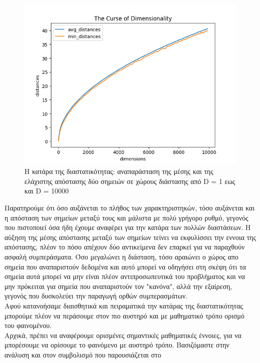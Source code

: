 \documentclass[12pt]{article}
\newenvironment{matlab}
	{\begin{figure}[H]\centering\captionsetup{justification=centering}}
	{\end{figure}}
\begin{document}
\begin{matlab}
	\includegraphics[scale=0.6]{images/the_curse_of_dimensionality_1_to_10000.png}
	\caption{Η κατάρα της διαστατικότητας:  αναπαράσταση της μέσης και της ελάχιστης απόστασης δύο σημειών σε χώρους διάστασης από D = 1 εως και D = 10000}
\end{matlab}

Παρατηρούμε ότι όσο αυξάνεται το πλήθος των χαρακτηριστηκών, τόσο αυξάνεται και η απόσταση των σημείων μεταξύ τους και μάλιστα με πολύ γρήγορο ρυθμό, γεγονός που πιστοποιεί όσα ήδη έχουμε αναφέρει για την κατάρα των πολλών διαστάσεων. Η αύξηση της μέσης απόστασης μεταξύ των σημείων τείνει να εκφυλίσσει την εννοια της απόστασης, πλέον το πόσο απέχουν δύο αντικείμενα δεν επαρκεί για να παραχθούν ασφαλή συμπεράσματα. Όσο μεγαλώνει η διάσταση, τόσο αραιώνει ο χώρος απο σημεία που αναπαριστούν δεδομένα και αυτό μπορεί να οδηγήσει στη σκέψη ότι τα σημεία αυτά μπορεί να μην είναι πλέον αντιπροσωπευτικά του προβλήματος και να μην πρόκειται για σημεία που αναπαριστούν τον "κανόνα", αλλά την εξαίρεση, γεγονός που δυσκολεύει την παραγωγή ορθών συμπερασμάτων. \\

Αφού κατανοήσαμε διαισθητικά και πειραματικά την κατάρας της διαστατικότητας μπορούμε πλέον να περάσουμε στον πιο αυστηρό και με μαθηματικό τρόπο ορισμό του φαινομένου. \\

Αρχικά, πρέπει να αναφέρουμε ορισμένες σημαντικές μαθηματικές έννοιες, για να μπορέσουμε να ορίσουμε το φαινόμενο με αυστηρό τρόπο. Βασιζόμαστε στην ανάλυση και στον συμβολισμό που παρουσιάζεται στο \cite{machinelearning} \\
\end{document}
